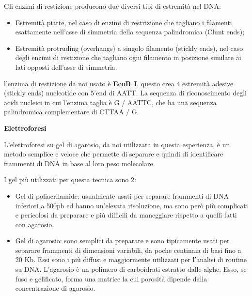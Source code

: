 Gli enzimi di restizione producono due diversi tipi di estremità nel DNA:
\begin{itemize}

	\item Estremità piatte, nel caso di enzimi di restrizione che tagliano i filamenti esattamente
	nell'asse di simmetria della sequenza palindromica (Clunt ends);
	\item Estremità protruding (overhangs) a singolo filamento (stickly ends), nel caso degli enzimi di
	restizione che tagliano ogni filamento in posizione similare ai lati opposti dell'asse di simmetria.

\end{itemize}

l'enzima di restizione da noi usato è \textbf{EcoR I}, questo crea 4 estremità
adesive (stickly ends) nucleotide con  5'end  di AATT. La sequenza di riconoscimento
degli acidi nucleici in cui l'enzima taglia è G / ​​AATTC, che ha una sequenza
palindromica complementare di CTTAA / G.

\vspace{0.5cm}


\textbf{Elettroforesi }

\vspace{0.3cm}



L'elettroforesi su gel di agarosio, da noi utilizzata in questa esperienza, è un
metodo semplice e veloce che permette di separare e quindi di identificare
frammenti di DNA in base al loro peso molecolare.

I gel più utilizzati per questa tecnica sono 2:
\begin{itemize}

	\item{Gel di poliacrilamide: } usualmente usati per separare frammenti di
	DNA inferiori a 500pb ed hanno un'elevata risoluzione, ma sono però più complicati
	e pericolosi da preparare e più difficili da maneggiare rispetto a quelli fatti con agarosio.

	\item{Gel di agarosio: } sono semplici da preparare e sono tipicamente usati per
	separare frammenti di dimensioni variabili, da poche centinaia di basi fino a 20 Kb.
	Essi sono i più diffusi e maggiormente utilizzati per l'analisi di routine su DNA.
	L'agarosio è un polimero di carboidrati estratto dalle alghe.
	Esso, se fuso e gelificato, forma una matrice la cui porosità dipende dalla concentrazione di agarosio.

\end{itemize}

